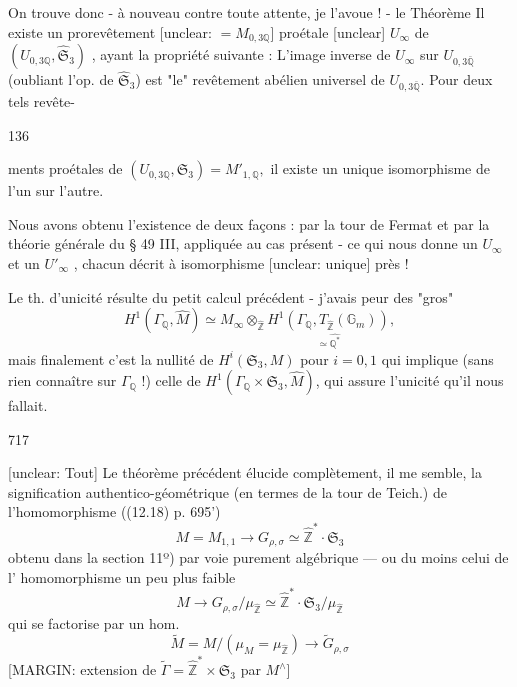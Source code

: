On trouve donc - à nouveau
contre toute attente, je l'avoue ! -
le
Théorème Il existe un prorevêtement [unclear: $= M_{0,3 \mathbb{Q}}$]
proétale [unclear] $U_\infty$ de $(U_{0,3 \mathbb{Q}}, \hat{\mathfrak{S}}_3)$ , ayant
la propriété suivante : L'image inverse
de $U_\infty$ sur $U_{0,3 \bar{\mathbb{Q}}}$ (oubliant l'op. de $\hat{\mathfrak{S}}_3$)
est "le" revêtement abélien universel
de $U_{0,3 \bar{\mathbb{Q}}}$. Pour deux tels revête-

136

\newpage


ments proétales de $(U_{0,3 \mathbb{Q}}, \mathfrak{S}_3) = M'_{1,\mathbb{Q}} ,$
il existe un unique isomorphisme
de l'un sur l'autre.

Nous avons obtenu l'existence de
deux façons : par la tour de Fermat
et par la théorie générale du § 49 III,
appliquée au cas présent - ce qui
nous donne un $U_\infty$ et un $U'_\infty$ ,
chacun décrit à isomorphisme [unclear: unique] près !

Le th. d'unicité résulte du
petit calcul précédent - j'avais
peur des "gros"
$$ H^1(\Gamma_{\mathbb{Q}}, \hat{M}) \simeq M_\infty \otimes_{\hat{\mathbb{Z}}} \underset{\simeq \widehat{\mathbb{Q}^*}}{H^1(\Gamma_{\mathbb{Q}}, T_{\hat{\mathbb{Z}}}(\mathbb{G}_m))} , $$
mais finalement c'est la nullité de
$H^i(\mathfrak{S}_3, M)$ pour $i=0,1$ qui implique
(sans rien connaître sur $\Gamma_{\mathbb{Q}}$ !)
celle de $H^1(\Gamma_{\mathbb{Q}} \times \mathfrak{S}_3, \hat{M})$, qui assure
l'unicité qu'il nous fallait.

\newpage


717

[unclear: Tout] Le théorème précédent élucide
complètement, il me semble, la
signification authentico-géométrique
(en termes de la tour de Teich.) de
l'homomorphisme ((12.18) p. 695')
$$M = M_{1,1} \longrightarrow G_{\rho, \sigma} \simeq \hat{\mathbb{Z}}^* \cdot \mathfrak{S}_3$$
obtenu dans la section 11º) par voie purement
algébrique — ou du moins celui de l'
homomorphisme un peu plus faible
$$M \longrightarrow G_{\rho, \sigma} / \mu_{\hat{\mathbb{Z}}} \simeq \hat{\mathbb{Z}}^* \cdot \mathfrak{S}_3 / \mu_{\hat{\mathbb{Z}}}$$
qui se factorise par un hom.
$$\tilde{M} = M / (\mu_M = \mu_{\hat{\mathbb{Z}}}) \longrightarrow \tilde{G}_{\rho, \sigma}$$
[MARGIN: extension de $\tilde{\Gamma} = \hat{\mathbb{Z}}^* \times \mathfrak{S}_3$ par $M^\wedge$]

